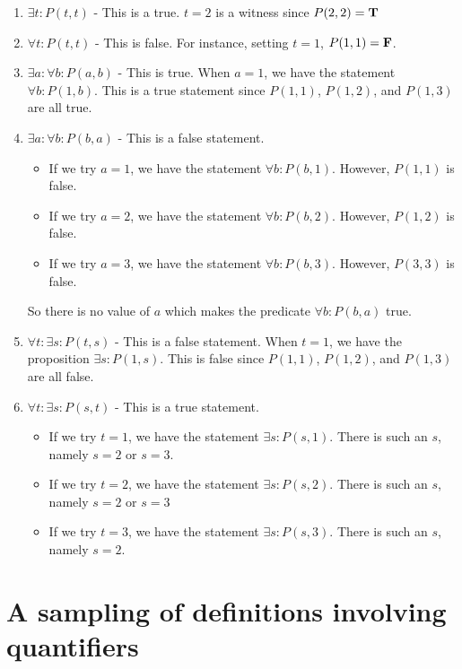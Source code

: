 \begin{solutions}
		\begin{enumerate}
		\item $\exists t: P(t,t)$ - This is a true.  $t = 2$ is a witness since $P(2,2) = \textbf{\textrm{T}}$
		\item $\forall t: P(t,t)$ - This is false.  For instance, setting $t =1$, $P(1,1) = \textbf{\textrm{F}}$.
		\item $\exists a: \forall b: P(a,b)$ - This is true.  When $a = 1$, we have the statement $\forall b: P(1,b)$.  This is a true statement since $P(1,1)$, $P(1,2)$, and $P(1,3)$ are all true.
		\item $\exists a: \forall b: P(b,a)$ - This is a false statement.  
		\begin{itemize}
				\item If we try $a = 1$, we have the statement $\forall b: P(b,1)$.  However, $P(1,1)$ is false.
				\item If we try $a = 2$, we have the statement $\forall b: P(b,2)$.  However, $P(1,2)$ is false.
				\item If we try $a = 3$, we have the statement $\forall b: P(b,3)$.  However, $P(3,3)$ is false.
			\end{itemize}
		
		So there is no value of $a$ which makes the predicate $\forall b: P(b,a)$ true.
		\item $\forall t: \exists s: P(t,s)$ - This is a false statement.  When $t  =1$, we have the proposition $\exists s: P(1,s)$.  This is false since $P(1,1)$, $P(1,2)$, and $P(1,3)$ are all false.
		\item $\forall t: \exists s: P(s,t)$  - This is a true statement.  
		
				\begin{itemize}
			\item If we try $t = 1$, we have the statement $\exists s: P(s,1)$.  There is such an $s$, namely $s = 2$ or $s = 3$.
			\item If we try $t = 2$, we have the statement $\exists s: P(s,2)$.  There is such an $s$, namely $s = 2$ or $s = 3$
			\item If we try $t = 3$, we have the statement $\exists s: P(s,3)$.  There is such an $s$, namely $s = 2$.
		\end{itemize}
	\end{enumerate}
	\end{solutions}


\section{A sampling of definitions involving quantifiers}

